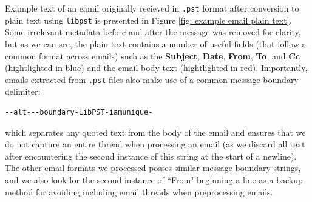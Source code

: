 \documentclass[fleqn]{MJDArticle}
\begin{document}
\noindent Example text of an eamil originally recieved in \texttt{.pst} format after conversion to plain text using \texttt{libpst} is presented in Figure \ref{fig: example email plain text}. Some irrelevant metadata before and after the message was removed for clarity, but as we can see, the plain text contains a number of useful fields (that follow a common format across emails) such as the \textbf{Subject}, \textbf{Date}, \textbf{From}, \textbf{To}, and \textbf{Cc} (hightlighted in {\color{blue}blue}) and the email body text (hightlighted in {\color{red}red}). Importantly, emails extracted from \texttt{.pst} files also make use of a common message boundary delimiter:
\begin{verbatim}
--alt---boundary-LibPST-iamunique-
\end{verbatim}
\noindent which separates any quoted text from the body of the email and ensures that we do not capture an entire thread when processing an email (as we discard all text after encountering the second instance of this string at the start of a newline). The other email formats we processed posses similar message boundary strings, and we also look for the second instance of ``From" beginning a line as a backup method for avoiding including email threads when preprocessing emails.
  
\end{document}

